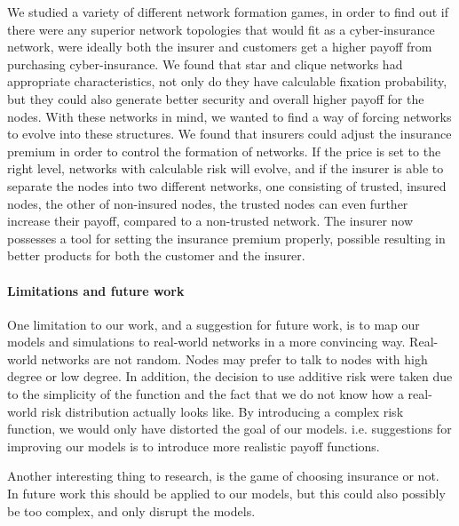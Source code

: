 We studied a variety of different network formation games, in order to find out if there were any superior network topologies that would fit as a cyber-insurance network, were ideally both the insurer and customers get a higher payoff from purchasing cyber-insurance. 
We found that star and clique networks had appropriate characteristics, not only do they have calculable fixation probability, but they could also generate better security and overall higher payoff for the nodes. With these networks in mind, we wanted to find a way of forcing networks to evolve into these structures.  We found that insurers could adjust the insurance premium in order to control the formation of networks. If the price is set to the right level, networks with calculable risk will evolve, and if the insurer is able to separate the nodes into two different networks, one consisting of trusted, insured nodes, the other of non-insured nodes, the trusted nodes can even further increase their payoff, compared to a non-trusted network. The insurer now possesses a tool for setting the insurance premium properly, possible resulting in better products for both the customer and the insurer.

\paragraph{Limitations and future work}
One limitation to our work, and a suggestion for future work, is to map our models and simulations to real-world networks in a more convincing way. Real-world networks are not random. Nodes may prefer to talk to nodes with high degree or low degree. In addition, the decision to use additive risk were taken due to the simplicity of the function and the fact that we do not know how a real-world risk distribution actually looks like.  By introducing a complex risk function, we would only have distorted the goal of our models. i.e. suggestions for improving our models is to introduce more realistic payoff functions.

Another interesting thing to research, is the game of choosing insurance or not. In future work this should be applied to our models, but this could also possibly be too complex, and only disrupt the models.